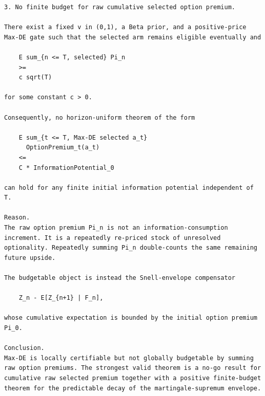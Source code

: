 \begin{small}
\begin{verbatim}
3. No finite budget for raw cumulative selected option premium.

There exist a fixed v in (0,1), a Beta prior, and a positive-price Max-DE gate such that the selected arm remains eligible eventually and

    E sum_{n <= T, selected} Pi_n
    >=
    c sqrt(T)

for some constant c > 0.

Consequently, no horizon-uniform theorem of the form

    E sum_{t <= T, Max-DE selected a_t}
      OptionPremium_t(a_t)
    <=
    C * InformationPotential_0

can hold for any finite initial information potential independent of T.

Reason.
The raw option premium Pi_n is not an information-consumption increment. It is a repeatedly re-priced stock of unresolved optionality. Repeatedly summing Pi_n double-counts the same remaining future upside.

The budgetable object is instead the Snell-envelope compensator

    Z_n - E[Z_{n+1} | F_n],

whose cumulative expectation is bounded by the initial option premium Pi_0.

Conclusion.
Max-DE is locally certifiable but not globally budgetable by summing raw option premiums. The strongest valid theorem is a no-go result for cumulative raw selected premium together with a positive finite-budget theorem for the predictable decay of the martingale-supremum envelope.
\end{verbatim}
\end{small}
